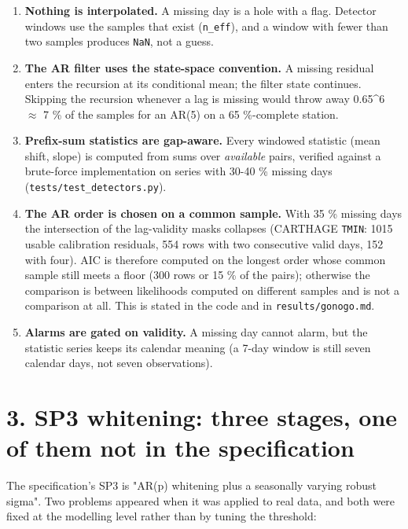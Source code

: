 \documentclass[10pt,a4paper]{article}
\begin{document}
\begin{enumerate}
\item \textbf{Nothing is interpolated.} A missing day is a hole with a flag. Detector
windows use the samples that exist (\texttt{n\_\allowbreak{}eff}), and a window with fewer than two samples produces \texttt{NaN}, not a guess.

\item \textbf{The AR filter uses the state-\allowbreak{}space convention.} A missing residual enters
the recursion at its conditional mean; the filter state continues. Skipping the recursion whenever a lag is missing would throw away 0.65\textasciicircum{}6 $\approx$ 7 \% of the samples for an AR(5) on a 65 \%-\allowbreak{}complete station.

\item \textbf{Prefix-\allowbreak{}sum statistics are gap-\allowbreak{}aware.} Every windowed statistic (mean
shift, slope) is computed from sums over \emph{available} pairs, verified against a brute-\allowbreak{}force implementation on series with 30-\allowbreak{}40 \% missing days (\texttt{tests/\allowbreak{}test\_\allowbreak{}detectors.py}).

\item \textbf{The AR order is chosen on a common sample.} With 35 \% missing days the
intersection of the lag-\allowbreak{}validity masks collapses (CARTHAGE \texttt{TMIN}: 1015 usable calibration residuals, 554 rows with two consecutive valid days, 152 with four). AIC is therefore computed on the longest order whose common sample still meets a floor (300 rows or 15 \% of the pairs); otherwise the comparison is between likelihoods computed on different samples and is not a comparison at all. This is stated in the code and in \texttt{results/\allowbreak{}gonogo.md}.

\item \textbf{Alarms are gated on validity.} A missing day cannot alarm, but the
statistic series keeps its calendar meaning (a 7-\allowbreak{}day window is still seven calendar days, not seven observations).

\end{enumerate}

\section*{3. SP3 whitening: three stages, one of them not in the specification}
The specification's SP3 is "AR(p) whitening plus a seasonally varying robust sigma". Two problems appeared when it was applied to real data, and both were fixed at the modelling level rather than by tuning the threshold:
\end{document}
